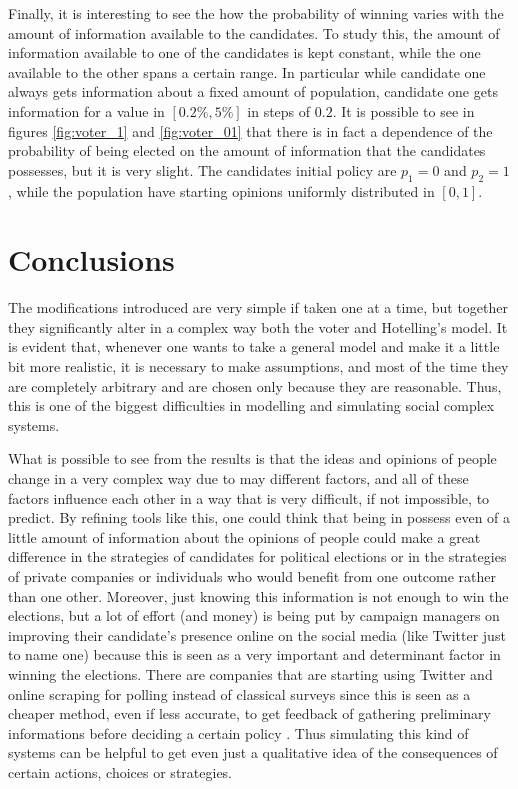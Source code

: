 \documentclass[11pt,a4paper,twocolumn]{article}
\begin{document}
Finally, it is interesting to see the how the probability of winning varies with the amount of information available to the candidates. To study this, the amount of information available to one of the candidates is kept constant, while the one available to the other spans a certain range. In particular while candidate one always gets information about a fixed amount of population, candidate one gets information for a value in $[0.2\%,5\%]$ in steps of $0.2$. It is possible to see in figures \ref{fig:voter_1} and \ref{fig:voter_01} that there is in fact a dependence of the probability of being elected on the amount of information that the candidates possesses, but it is very slight. The candidates initial policy are $p_1=0$ and $p_2=1$, while the population have starting opinions uniformly distributed in $[0,1]$.

\section*{Conclusions}

The modifications introduced are very simple if taken one at a time, but together they significantly alter in a complex way both the voter and Hotelling's model.
It is evident that, whenever one wants to take a general model and make it a little bit more realistic, it is necessary to make assumptions, and most of the time they are completely arbitrary and are chosen only because they are reasonable. Thus, this is one of the biggest difficulties in modelling and simulating social complex systems.

What is possible to see from the results is that the ideas and opinions of people change in a very complex way due to may different factors, and all of these factors influence each other in a way that is very difficult, if not impossible, to predict.
By refining tools like this, one could think that being in possess even of a little amount of information about the opinions of people could make a great difference in the strategies of candidates for political elections or in the strategies of private companies or individuals who would benefit from one outcome rather than one other. Moreover, just knowing this information is not enough to win the elections, but a lot of effort (and money) is being put by campaign managers on improving their candidate's presence online on the social media (like Twitter just to name one) because this is seen as a very important and determinant factor in winning the elections.
There are companies that are starting using Twitter and online scraping for polling instead of classical surveys since this is seen as a cheaper method, even if less accurate, to get feedback of gathering preliminary informations before deciding a certain policy \cite{influence}.
Thus simulating this kind of systems can be helpful to get even just a qualitative idea of the consequences of certain actions, choices or strategies.
\end{document}
